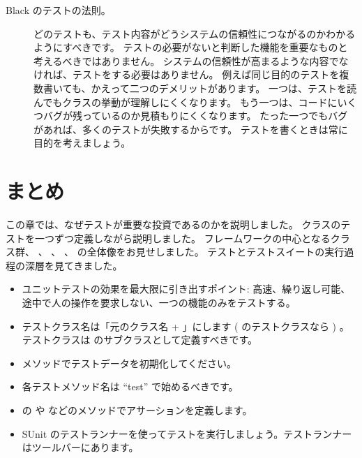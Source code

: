 \documentclass[a4paper,10pt,twoside]{book}
\begin{document}
\begin{description}
\item[Black のテストの法則。]


  どのテストも、テスト内容がどうシステムの信頼性につながるのかわかるようにすべきです。
  テストの必要がないと判断した機能を重要なものと考えるべきではありません。
  システムの信頼性が高まるような内容でなければ、テストをする必要はありません。
  例えば同じ目的のテストを複数書いても、かえって二つのデメリットがあります。
  一つは、テストを読んでもクラスの挙動が理解しにくくなります。
  もう一つは、コードにいくつバグが残っているのか見積もりにくくなります。
  たった一つでもバグがあれば、多くのテストが失敗するからです。
  テストを書くときは常に目的を考えましょう。


\end{description}

\section{まとめ}

この章では、なぜテストが重要な投資であるのかを説明しました。
 クラスのテストを一つずつ定義しながら説明しました。
\sunit フレームワークの中心となるクラス群、  、  、  、  の全体像をお見せしました。
テストとテストスイートの実行過程の深層を見てきました。

\begin{itemize}
  \item ユニットテストの効果を最大限に引き出すポイント: 高速、繰り返し可能、 途中で人の操作を要求しない、一つの機能のみをテストする。

  \item テストクラス名は「元のクラス名 +  」にします ( のテストクラスなら ) 。テストクラスは  のサブクラスとして定義すべきです。

  \item {} メソッドでテストデータを初期化してください。

  \item 各テストメソッド名は ``test'' で始めるべきです。

  \item {} の  や  などのメソッドでアサーションを定義します。

  \item SUnit のテストランナーを使ってテストを実行しましょう。テストランナーはツールバーにあります。

\end{itemize}

\ifx\wholebook\relax\else
   
   
\end{document}

